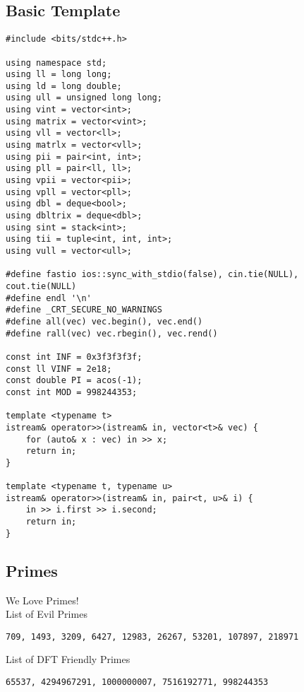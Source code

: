 \documentclass[landscape, 8pt, a4paper, oneside, twocolumn]{extarticle}
\begin{document}
\subsection{Basic Template}
\begin{verbatim}
#include <bits/stdc++.h>

using namespace std;
using ll = long long;
using ld = long double;
using ull = unsigned long long;
using vint = vector<int>;
using matrix = vector<vint>;
using vll = vector<ll>;
using matrlx = vector<vll>;
using pii = pair<int, int>;
using pll = pair<ll, ll>;
using vpii = vector<pii>;
using vpll = vector<pll>;
using dbl = deque<bool>;
using dbltrix = deque<dbl>;
using sint = stack<int>;
using tii = tuple<int, int, int>;
using vull = vector<ull>;

#define fastio ios::sync_with_stdio(false), cin.tie(NULL), cout.tie(NULL)
#define endl '\n'
#define _CRT_SECURE_NO_WARNINGS
#define all(vec) vec.begin(), vec.end()
#define rall(vec) vec.rbegin(), vec.rend()

const int INF = 0x3f3f3f3f;
const ll VINF = 2e18;
const double PI = acos(-1);
const int MOD = 998244353;

template <typename t>
istream& operator>>(istream& in, vector<t>& vec) {
    for (auto& x : vec) in >> x;
    return in;
}

template <typename t, typename u>
istream& operator>>(istream& in, pair<t, u>& i) {
    in >> i.first >> i.second;
    return in;
}
\end{verbatim}
\subsection{Primes}
{We Love Primes!}\\
{List of Evil Primes}
\begin{verbatim}
709, 1493, 3209, 6427, 12983, 26267, 53201, 107897, 218971
\end{verbatim}
{List of DFT Friendly Primes}
\begin{verbatim}
65537, 4294967291, 1000000007, 7516192771, 998244353
\end{verbatim}
\end{document}
